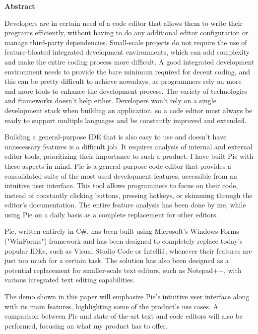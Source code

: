 \thispagestyle{pagestyle}

\begin{center}
    \textbf{\fontsize{20pt}{24pt} \selectfont Abstract}
\end{center}

Developers are in certain need of a code editor that allows them to write their programs efficiently, without having to do any additional editor configuration or manage third-party dependencies. Small-scale projects do not require the use of feature-bloated integrated development environments, which can add complexity and make the entire coding process more difficult. A good integrated development environment needs to provide the bare minimum required for decent coding, and this can be pretty difficult to achieve nowadays, as programmers rely on more and more tools to enhance the development process. The variety of technologies and frameworks doesn't help either. Developers won't rely on a single development stack when building an application, so a code editor must always be ready to support multiple languages and be constantly improved and extended.

Building a general-purpose IDE that is also easy to use and doesn't have unnecessary features is a difficult job. It requires analysis of internal and external editor tools, prioritizing their importance to such a product. I have built Pie with these aspects in mind. Pie is a general-purpose code editor that provides a consolidated suite of the most used development features, accessible from an intuitive user interface. This tool allows programmers to focus on their code, instead of constantly clicking buttons, pressing hotkeys, or skimming through the editor's documentation. The entire feature analysis has been done by me, while using Pie on a daily basis as a complete replacement for other editors.

Pie, written entirely in C\#, has been built using Microsoft's Windows Forms ("WinForms") framework and has been designed to completely replace today's popular IDEs, such as Visual Studio Code or IntelliJ, whenever their features are just too much for a certain task. The solution has also been designed as a potential replacement for smaller-scale text editors, such as Notepad++, with various integrated text editing capabilities.

The demo shown in this paper will emphasize Pie's intuitive user interface along with its main features, highlighting some of the product's use cases. A comparison between Pie and state-of-the-art text and code editors will also be performed, focusing on what my product has to offer.
\vfill